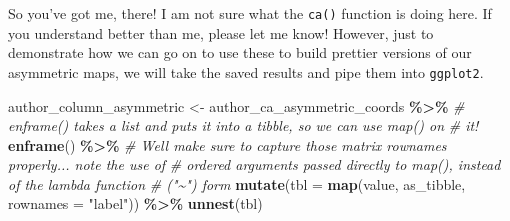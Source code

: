 \documentclass[
]{book}
\newenvironment{Shaded}{\begin{snugshade}}{\end{snugshade}}
\newcommand{\AttributeTok}[1]{\textcolor[rgb]{0.13,0.29,0.53}{#1}}
\newcommand{\CommentTok}[1]{\textcolor[rgb]{0.56,0.35,0.01}{\textit{#1}}}
\newcommand{\FunctionTok}[1]{\textcolor[rgb]{0.13,0.29,0.53}{\textbf{#1}}}
\newcommand{\NormalTok}[1]{#1}
\newcommand{\OtherTok}[1]{\textcolor[rgb]{0.56,0.35,0.01}{#1}}
\newcommand{\SpecialCharTok}[1]{\textcolor[rgb]{0.81,0.36,0.00}{\textbf{#1}}}
\newcommand{\StringTok}[1]{\textcolor[rgb]{0.31,0.60,0.02}{#1}}
\begin{document}
So you've got me, there! I am not sure what the \texttt{ca()} function is doing here. If you understand better than me, please let me know! However, just to demonstrate how we can go on to use these to build prettier versions of our asymmetric maps, we will take the saved results and pipe them into \texttt{ggplot2}.

\begin{Shaded}
\begin{Highlighting}[]
\NormalTok{author\_column\_asymmetric }\OtherTok{\textless{}{-}} 
\NormalTok{  author\_ca\_asymmetric\_coords }\SpecialCharTok{\%\textgreater{}\%}
  \CommentTok{\# \textasciigrave{}enframe()\textasciigrave{} takes a list and puts it into a tibble, so we can use \textasciigrave{}map()\textasciigrave{} on}
  \CommentTok{\# it!}
  \FunctionTok{enframe}\NormalTok{() }\SpecialCharTok{\%\textgreater{}\%}
  \CommentTok{\# We\textquotesingle{}ll make sure to capture those matrix rownames properly... note the use of}
  \CommentTok{\# ordered arguments passed directly to \textasciigrave{}map()\textasciigrave{}, instead of the lambda function}
  \CommentTok{\# ("\textasciitilde{}") form}
  \FunctionTok{mutate}\NormalTok{(}\AttributeTok{tbl =} \FunctionTok{map}\NormalTok{(value, as\_tibble, }\AttributeTok{rownames =} \StringTok{"label"}\NormalTok{)) }\SpecialCharTok{\%\textgreater{}\%}
  \FunctionTok{unnest}\NormalTok{(tbl)}


\end{Highlighting}
\end{Shaded}
\end{document}
